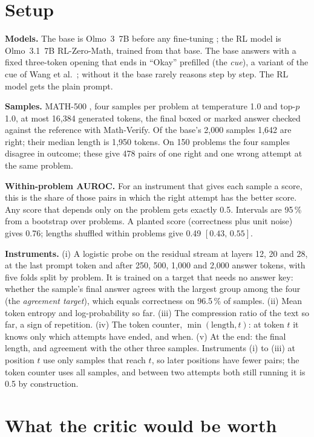 \documentclass[10pt]{article}
\newcommand{\ci}[2]{$[#1,\,#2]$}
\begin{document}
\section{Setup}

\textbf{Models.} The base is Olmo~3~7B before any fine-tuning \cite{ettinger2025olmo}; the RL model is
Olmo~3.1~7B RL-Zero-Math, trained from that base. The base answers with a fixed three-token opening that ends in
``Okay'' prefilled (the \emph{cue}), a variant of the cue of Wang et al.\ \cite{wang2026base}; without it the
base rarely reasons step by step. The RL model gets the plain prompt.

\textbf{Samples.} MATH-500 \cite{hendrycks2021measuring,lightman2023lets}, four samples per problem at temperature
1.0 and top-$p$ 1.0, at most 16{,}384 generated tokens, the final boxed or marked answer checked against the reference with Math-Verify. Of the
base's 2{,}000 samples 1{,}642 are right; their median length is 1{,}950 tokens. On 150 problems the four
samples disagree in outcome; these give 478 pairs of one right and one wrong attempt at the same problem.

\textbf{Within-problem AUROC.} For an instrument that gives each sample a score, this is the share of those pairs
in which the right attempt has the better score. Any score that depends only on the problem gets exactly 0.5.
Intervals are 95\,\% from a bootstrap over problems. A planted score (correctness plus unit noise) gives 0.76;
lengths shuffled within problems give 0.49 \ci{0.43}{0.55}.

\textbf{Instruments.} (i) A logistic probe on the residual stream at layers 12, 20 and 28, at the last prompt token
and after 250, 500, 1{,}000 and 2{,}000 answer tokens, with five folds split by problem. It is trained on a
target that needs no answer key: whether the sample's final answer agrees with the largest group among the four
(the \emph{agreement target}), which equals correctness on 96.5\,\% of samples. (ii) Mean token entropy and
log-probability so far. (iii) The compression ratio of the text so far, a sign of repetition. (iv) The token
counter, $\min(\text{length}, t)$: at token $t$ it knows only which attempts have ended, and when. (v) At the
end: the final length, and agreement with the other three samples. Instruments (i) to (iii) at position $t$ use
only samples that reach $t$, so later positions have fewer pairs; the token counter uses all samples, and
between two attempts both still running it is 0.5 by construction.

\section{What the critic would be worth}
\end{document}
